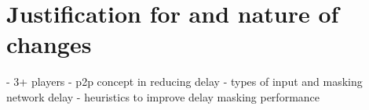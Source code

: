\documentclass{article}
\begin{document}
\section{Justification for and nature of changes}
% 
 - 3+ players
 - p2p concept in reducing delay
 - types of input and masking network delay
   - heuristics to improve delay masking performance



\clearpage


\end{document}

